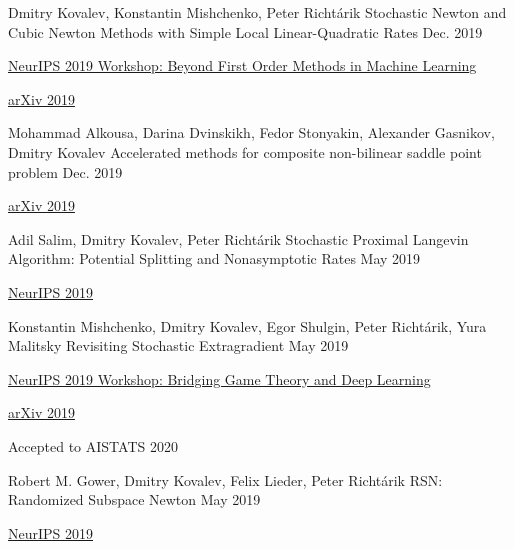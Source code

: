 \begin{cventries}
\cventry
{Dmitry Kovalev, Konstantin Mishchenko, Peter Richtárik} %
{Stochastic Newton and Cubic Newton Methods with Simple Local Linear-Quadratic Rates} %
{} %
{Dec. 2019} %
{ %
	\begin{cvitems}
		\item {\href{https://sites.google.com/site/optneurips19/}{NeurIPS 2019 Workshop: Beyond First Order Methods in Machine Learning}}
		\item {\href{https://arxiv.org/pdf/1912.01597.pdf}{arXiv 2019}}		
	\end{cvitems}
}	

\cventry
{Mohammad Alkousa, Darina Dvinskikh, Fedor Stonyakin, Alexander Gasnikov, Dmitry Kovalev} %
{Accelerated methods for composite non-bilinear saddle point problem} %
{} %
{Dec. 2019} %
{ %
	\begin{cvitems}
		\item {\href{https://arxiv.org/abs/1906.03620}{arXiv 2019}}
	\end{cvitems}
}	

\cventry
{Adil Salim, Dmitry Kovalev, Peter Richtárik} %
{Stochastic Proximal Langevin Algorithm: Potential Splitting and Nonasymptotic Rates} %
{} %
{May 2019} %
{ %
	\begin{cvitems}
		\item {\href{https://papers.nips.cc/paper/8891-stochastic-proximal-langevin-algorithm-potential-splitting-and-nonasymptotic-rates}{NeurIPS 2019}}
	\end{cvitems}
}	
	
\cventry
{Konstantin Mishchenko, Dmitry Kovalev, Egor Shulgin, Peter Richtárik, Yura Malitsky} %
{Revisiting Stochastic Extragradient} %
{} %
{May 2019} %
{ %
	\begin{cvitems}
		\item {\href{https://sgo-workshop.github.io}{NeurIPS 2019 Workshop: Bridging Game Theory and Deep Learning}}
		\item {\href{https://arxiv.org/abs/1905.11373}{arXiv 2019}}
		\item Accepted to AISTATS 2020
	\end{cvitems}
}

\cventry
{Robert M. Gower, Dmitry Kovalev, Felix Lieder, Peter Richtárik} %
{RSN: Randomized Subspace Newton} %
{} %
{May 2019} %
{ %
	\begin{cvitems}
		\item {\href{https://papers.nips.cc/paper/8351-rsn-randomized-subspace-newton}{NeurIPS 2019}}
	\end{cvitems}
}


\end{cventries}
